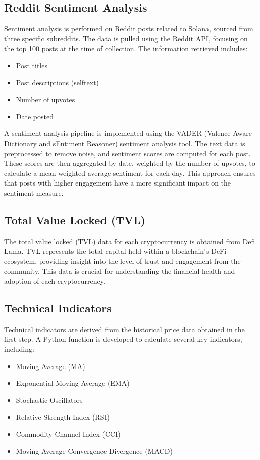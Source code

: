 \subsection{Reddit Sentiment Analysis}
Sentiment analysis is performed on Reddit posts related to Solana, sourced from three specific subreddits. The data is pulled using the Reddit API, focusing on the top 100 posts 
at the time of collection. The information retrieved includes:

\begin{itemize}
    \item Post titles
    \item Post descriptions (selftext)
    \item Number of upvotes
    \item Date posted
\end{itemize}

A sentiment analysis pipeline is implemented using the VADER (Valence Aware Dictionary and sEntiment Reasoner) sentiment analysis tool. The text data is 
preprocessed to remove noise, and sentiment scores are computed for each post. These scores are then aggregated by date, weighted by the number of upvotes, 
to calculate a mean weighted average sentiment for each day. This approach ensures that posts with higher engagement have a more significant impact on the sentiment measure.

\subsection{Total Value Locked (TVL)}
The total value locked (TVL) data for each cryptocurrency is obtained from Defi Lama. TVL represents the total capital held within a blockchain's DeFi ecosystem, 
providing insight into the level of trust and engagement from the community. This data is crucial for understanding the financial health and adoption of each cryptocurrency.

\subsection{Technical Indicators}
Technical indicators are derived from the historical price data obtained in the first step. A Python function is developed to calculate several key indicators, including:

\begin{itemize}
    \item Moving Average (MA)
    \item Exponential Moving Average (EMA)
    \item Stochastic Oscillators
    \item Relative Strength Index (RSI)
    \item Commodity Channel Index (CCI)
    \item Moving Average Convergence Divergence (MACD)
\end{itemize}

